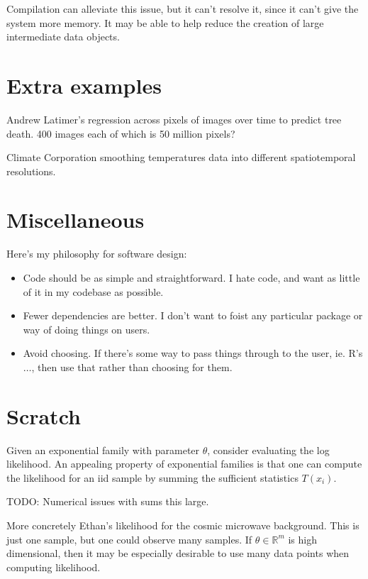 \documentclass[12pt]{article}
\begin{document}
Compilation can alleviate this issue, but it can't resolve it, since it
can't give the system more memory. It may be able to help reduce the
creation of large intermediate data objects.


\section{Extra examples}

Andrew Latimer's regression across pixels of images over time to predict
tree death. 400 images each of which is 50 million pixels?

Climate Corporation smoothing temperatures data into different
spatiotemporal resolutions.

\section{Miscellaneous}

Here's my philosophy for software design:

\begin{itemize}
    \item Code should be as simple and straightforward. I hate code, and want as
        little of it in my codebase as possible.
    \item Fewer dependencies are better. I don't want to foist any
        particular package or way of doing things on users.
    \item Avoid choosing. If there's some way to pass things through to the
        user, ie. R's $\dots$, then use that rather than choosing for them.
\end{itemize}

\section{Scratch}

Given an exponential family with parameter $\theta$, consider evaluating
the log likelihood. An appealing property of exponential families is that
one can compute the likelihood for an iid sample by summing the
sufficient statistics $T(x_i)$.

TODO: Numerical issues with sums this large.

More concretely Ethan's likelihood for the cosmic microwave background. 
This is just one sample, but one could observe many samples.
If $\theta \in \mathbb{R}^m$ is high dimensional, then it may be
especially desirable to use many data points when computing likelihood.




 
\end{document}
